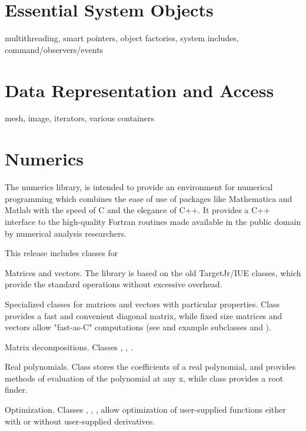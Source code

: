 \section{Essential System Objects}
\label{sec:EssentialSystemObjects}

	multithreading, smart pointers, object factories, system includes,
	command/observers/events

\section{Data Representation and Access}
\label{sec:DataRepresentationAndAccess}

	mesh, image, iterators, various containers

\section{Numerics}
\label{sec:Numerics}

The numerics library,  is intended to provide an environment for numerical
programming which combines the ease of use of packages like Mathematica and
Matlab with the speed of C and the elegance of C++. It provides a C++
interface to the high-quality Fortran routines made available in the public
domain by numerical analysis researchers.

This release includes classes for 

Matrices and vectors. The library is based on the old TargetJr/IUE classes, which provide the standard operations without excessive overhead. 

Specialized classes for matrices and vectors with particular properties. Class  provides a fast and convenient diagonal matrix, while fixed size matrices and vectors allow "fast-as-C" computations (see  and example subclasses  and ). 

Matrix decompositions. Classes ,  , . 

Real polynomials. Class  stores the coefficients of a real polynomial, and provides methods of evaluation of the polynomial at any x, while class  provides a root finder. 

Optimization. Classes , , ,  allow optimization of user-supplied functions either with or without user-supplied derivatives. 

